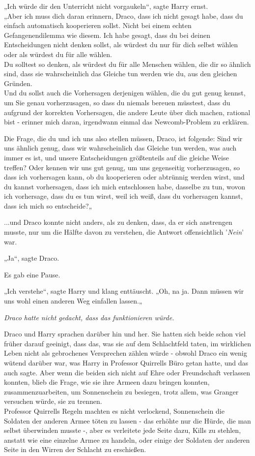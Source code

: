 {„Ich würde dir den Unterricht nicht vorgaukeln“, sagte Harry ernst.\\ „Aber ich muss dich daran erinnern, Draco, dass ich nicht gesagt habe, dass du einfach automatisch kooperieren sollst. Nicht bei einem echten Gefangenendilemma wie diesem. Ich habe gesagt, dass du bei deinen Entscheidungen nicht denken sollst, als würdest du nur für dich selbst wählen oder als würdest du für alle wählen.\\ Du solltest so denken, als würdest du für alle Menschen wählen, die dir so ähnlich sind, dass sie wahrscheinlich das Gleiche tun werden wie du, aus den gleichen Gründen.\\ Und du sollst auch die Vorhersagen derjenigen wählen, die du gut genug kennst, um Sie genau vorherzusagen, so dass du niemals bereuen müsstest, dass du aufgrund der korrekten Vorhersagen, die andere Leute über dich machen, rational bist - erinner mich daran, irgendwann einmal das Newcomb-Problem zu erklären.

Die Frage, die du und ich uns also stellen müssen, Draco, ist folgende: Sind wir uns ähnlich genug, dass wir wahrscheinlich das Gleiche tun werden, was auch immer es ist, und unsere Entscheidungen größtenteils auf die gleiche Weise treffen? Oder kennen wir uns gut genug, um uns gegenseitig vorherzusagen, so dass ich vorhersagen kann, ob du kooperieren oder abtrünnig werden wirst, und du kannst vorhersagen, dass ich mich entschlossen habe, dasselbe zu tun, wovon ich vorhersage, dass du es tun wirst, weil ich weiß, dass du vorhersagen kannst, dass ich mich so entscheide?„

...und Draco konnte nicht anders, als zu denken, dass, da er sich anstrengen musste, nur um die Hälfte davon zu verstehen, die Antwort offensichtlich '\emph{Nein}' war.

„Ja“, sagte Draco.

Es gab eine Pause.

„Ich verstehe“, sagte Harry und klang enttäuscht. „Oh, na ja. Dann müssen wir uns wohl einen anderen Weg einfallen lassen.„

\emph{Draco hatte nicht gedacht, dass das funktionieren würde.}

Draco und Harry sprachen darüber hin und her. Sie hatten sich beide schon viel früher darauf geeinigt, dass das, was sie auf dem Schlachtfeld taten, im wirklichen Leben nicht als gebrochenes Versprechen zählen würde - obwohl Draco ein wenig wütend darüber war, was Harry in Professor Quirrells Büro getan hatte, und das auch sagte. Aber wenn die beiden sich nicht auf Ehre oder Freundschaft verlassen konnten, blieb die Frage, wie sie ihre Armeen dazu bringen konnten, zusammenzuarbeiten, um Sonnenschein zu besiegen, trotz allem, was Granger versuchen würde, sie zu trennen.\\ Professor Quirrells Regeln machten es nicht verlockend, Sonnenschein die Soldaten der anderen Armee töten zu lassen - das erhöhte nur die Hürde, die man selbst überwinden musste -, aber es verleitete jede Seite dazu, Kills zu stehlen, anstatt wie eine einzelne Armee zu handeln, oder einige der Soldaten der anderen Seite in den Wirren der Schlacht zu erschießen.

}
